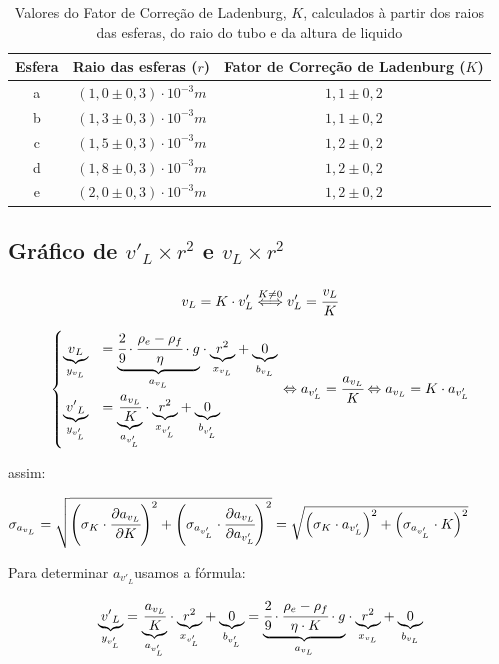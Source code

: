 \documentclass[english,brazil]{article}
\providecommand{\tabularnewline}{\\}
\providecommand{\tabularnewline}{\\}
\begin{document}
		\begin{table}[H]
			\caption{Valores do Fator de Correção de Ladenburg, $K$, calculados à partir
			dos raios das esferas, do raio do tubo e da altura de liquido}


			\centering{}%
			\begin{tabular}{|c|c|c|}
				\hline 
				Esfera & Raio das esferas ($r$)  & Fator de Correção de Ladenburg ($K$)\tabularnewline
				\hline 
				a & $(1,0\pm0,3)\cdot10^{-3}\unit{m}$ & $1,1\pm0,2$\tabularnewline
				\hline 
				b & $(1,3\pm0,3)\cdot10^{-3}\unit{m}$ & $1,1\pm0,2$\tabularnewline
				\hline 
				c & $(1,5\pm0,3)\cdot10^{-3}\unit{m}$ & $1,2\pm0,2$\tabularnewline
				\hline 
				d & $(1,8\pm0,3)\cdot10^{-3}\unit{m}$ & $1,2\pm0,2$\tabularnewline
				\hline 
				e & $(2,0\pm0,3)\cdot10^{-3}\unit{m}$ & $1,2\pm0,2$\tabularnewline
				\hline 
			\end{tabular}
		\end{table}

	\subsection{Gráfico de $v'_{L}\times r^{2}$ e $v_{L}\times r^{2}$}

		\[
			v_{L}=K\cdot v'_{L}\overset{K\neq0}{\Longleftrightarrow}v'_{L}=\cfrac{v_{L}}{K}
		\]


		\[
		\begin{cases}
			\underset{y_{v_{L}}}{\underbrace{v{}_{L}}} & =\underset{a_{v_{L}}}{\underbrace{\cfrac{2}{9}\cdot\cfrac{\rho_{e}-\rho_{f}}{\eta}\cdot g}}\cdot\underset{x_{v_{L}}}{\underbrace{r^{2}}}+\underset{b_{v_{L}}}{\underbrace{0}}\\
			\underset{y_{v'_{L}}}{\underbrace{v'{}_{L}}} & =\underset{a_{v'_{L}}}{\underbrace{\cfrac{a_{v_{L}}}{K}}}\cdot\underset{x_{v'_{L}}}{\underbrace{r^{2}}}+\underset{b_{v'_{L}}}{\underbrace{0}}
		\end{cases}\Leftrightarrow a_{v'_{L}}=\cfrac{a_{v_{L}}}{K}\Leftrightarrow a_{v_{L}}=K\cdot a_{v'_{L}}
		\]


		assim:

		$\sigma_{a_{v_{L}}}=\sqrt{\left(\sigma_{K}\cdot\cfrac{\partial a_{v_{L}}}{\partial K}\right)^{2}+\left(\sigma_{a_{v'_{L}}}\cdot\cfrac{\partial a_{v_{L}}}{\partial a_{v'_{L}}}\right)^{2}}=\sqrt{\left(\sigma_{K}\cdot a_{v'_{L}}\right)^{2}+\left(\sigma_{a_{v'_{L}}}\cdot K\right)^{2}}$

		Para determinar $a_{v'_{L}}$usamos a fórmula:

		\[
			\underset{y_{v'_{L}}}{\underbrace{v'{}_{L}}}=\underset{a_{v'_{L}}}{\underbrace{\cfrac{a_{v_{L}}}{K}}}\cdot\underset{x_{v'_{L}}}{\underbrace{r^{2}}}+\underset{b_{v'_{L}}}{\underbrace{0}}=\underset{a_{v_{L}}}{\underbrace{\cfrac{2}{9}\cdot\cfrac{\rho_{e}-\rho_{f}}{\eta\cdot K}\cdot g}}\cdot\underset{x_{v_{L}}}{\underbrace{r^{2}}}+\underset{b_{v_{L}}}{\underbrace{0}}
		\]
\end{document}
